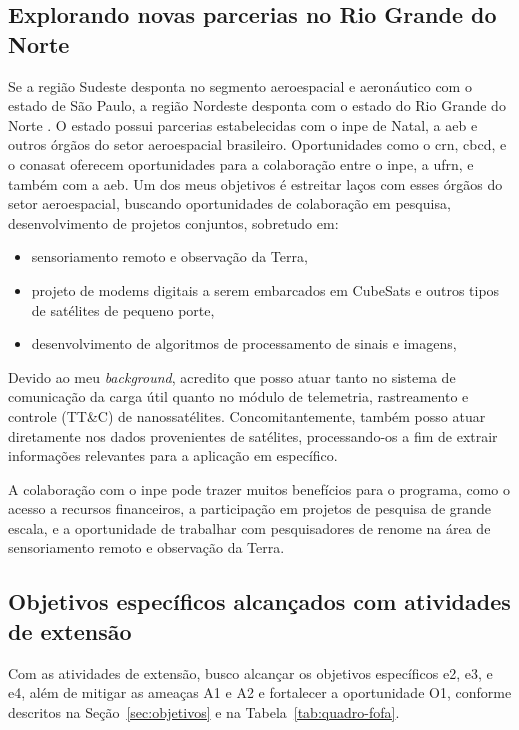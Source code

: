 \documentclass{article}
\begin{document}
\subsection{Explorando novas parcerias no Rio Grande do Norte}

Se a região Sudeste desponta no segmento aeroespacial e aeronáutico com o estado de São Paulo, a região Nordeste desponta com o estado do Rio Grande do Norte \cite{reboucas2025ufrn_orbita_inovacao_espacial}. O estado possui parcerias estabelecidas com o \gls{inpe} de Natal, a \gls{aeb} e outros órgãos do setor aeroespacial brasileiro. Oportunidades como o \gls{crn}, \gls{cbcd}, e o \gls{conasat} oferecem oportunidades para a colaboração entre o \gls{inpe}, a \gls{ufrn}, e também com a \gls{aeb}. Um dos meus objetivos é estreitar laços com esses órgãos do setor aeroespacial, buscando oportunidades de colaboração em pesquisa, desenvolvimento de projetos conjuntos, sobretudo em:
\begin{itemize}
    \item sensoriamento remoto e observação da Terra,
    \item projeto de modems digitais a serem embarcados em CubeSats e outros tipos de satélites de pequeno porte,
    \item desenvolvimento de algoritmos de processamento de sinais e imagens,
\end{itemize}

Devido ao meu \textit{background}, acredito que posso atuar tanto no sistema de comunicação da carga útil quanto no módulo de telemetria, rastreamento e controle (TT\&C) de nanossatélites. Concomitantemente, também posso atuar diretamente nos dados provenientes de satélites, processando-os a fim de extrair informações relevantes para a aplicação em específico.

A colaboração com o \gls{inpe} pode trazer muitos benefícios para o programa, como o acesso a recursos financeiros, a participação em projetos de pesquisa de grande escala, e a oportunidade de trabalhar com pesquisadores de renome na área de sensoriamento remoto e observação da Terra.

\subsection{Objetivos específicos alcançados com atividades de extensão}

Com as atividades de extensão, busco alcançar os objetivos específicos e2, e3, e e4, além de mitigar as ameaças A1 e A2 e fortalecer a oportunidade O1, conforme descritos na Seção~\ref{sec:objetivos} e na Tabela~\ref{tab:quadro-fofa}.
\end{document}
